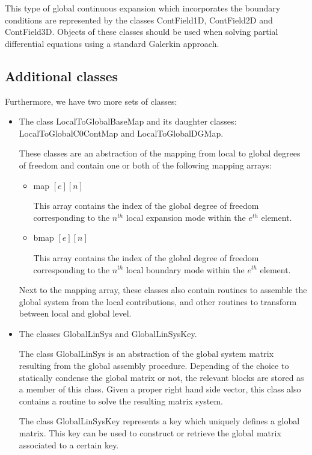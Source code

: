 This type of global continuous expansion which incorporates the boundary
 conditions are represented by the classes ContField1D, ContField2D and
 ContField3D. Objects of these classes should be used when solving partial
 differential equations using a standard Galerkin approach.


\subsection{Additional classes}
Furthermore, we have two more sets of classes:
\begin{itemize}
\item The class LocalToGlobalBaseMap and its daughter classes:
  LocalToGlobalC0ContMap and LocalToGlobalDGMap.
  
  These classes are an abstraction of the mapping from local to global degrees
  of freedom and contain one or both of the following mapping arrays:
  \begin{itemize}
  \item map $[e][n]$

    This array contains the index of the global degree of freedom corresponding
    to the $n^{th}$ local expansion mode within the $e^{th}$ element.
  \item bmap $[e][n]$
  
    This array contains the index of the global degree of freedom corresponding
    to the $n^{th}$ local boundary mode within the
    $e^{th}$ element.
  \end{itemize}
  Next to the mapping array, these classes also contain routines to assemble the
  global system from the local contributions, and other routines to transform
  between local and global level.
\item The classes GlobalLinSys and GlobalLinSysKey.

  The class GlobalLinSys is an abstraction of the global system matrix
  resulting from the global assembly procedure. Depending of the choice to
  statically condense the global matrix or not, the relevant blocks are stored
  as a member of this class. Given a proper right hand side vector, this class
  also contains a routine to solve the resulting matrix system.
  
  The class GlobalLinSysKey represents a key which uniquely defines a global
  matrix. This key can be used to construct or retrieve the global matrix 
  associated to a certain key.
\end{itemize}

